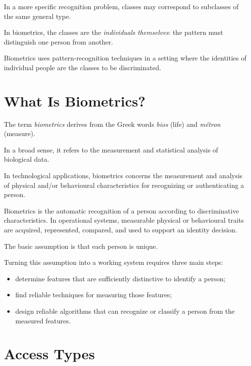 \documentclass[11pt,a4paper,oneside]{report}
\begin{document}
In a more specific recognition problem, classes may correspond to
subclasses of the same general type.

In biometrics, the classes are the \emph{individuals themselves}:
the pattern must distinguish one person from another.

\begin{keyconcept}
Biometrics uses pattern-recognition techniques in a setting where the
identities of individual people are the classes to be discriminated.
\end{keyconcept}

\section{What Is Biometrics?}
\label{subsec:what-biometrics}

The term \emph{biometrics} derives from the Greek words
\emph{bios} (life) and \emph{m\'etron} (measure).

In a broad sense, it refers to the measurement and statistical analysis
of biological data.

In technological applications, biometrics concerns the
measurement and analysis of physical and/or behavioural characteristics
for recognizing or authenticating a person.

\begin{definitionbox}[ -- Biometrics]
Biometrics is the automatic recognition of a person according to
discriminative characteristics. In operational systems, measurable
physical or behavioural traits are acquired, represented, compared,
and used to support an identity decision.
\end{definitionbox}

The basic assumption is that each person is unique.

Turning this assumption into a working system requires three main steps:

\begin{itemize}
    \item determine features that are sufficiently distinctive to identify
    a person;

    \item find reliable techniques for measuring those features;

    \item design reliable algorithms that can recognize or classify a
    person from the measured features.
\end{itemize}

\section{Access Types}
\label{subsec:access-types}
\end{document}
